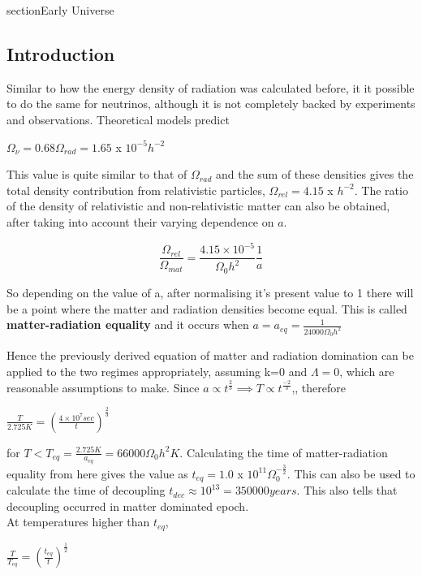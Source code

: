 section{Early Universe}
\subsection{Introduction}
Similar to how the energy density of radiation was calculated before, it it possible to do the same for neutrinos, although it is not completely backed by experiments and observations. Theoretical models predict

\begin{center}
    $\Omega_{\nu} = 0.68\Omega_{rad} = 1.65$ x $10^{-5}h^{-2}$
\end{center}

This value is quite similar to that of $\Omega_{rad}$ and the sum of these densities gives the total density contribution from relativistic particles, $\Omega_{rel} = 4.15$ x $h^{-2}$.
The ratio of the density of relativistic and non-relativistic matter can also be obtained, after taking into account their varying dependence on $a$.

\begin{equation}
    \frac{\Omega_{rel}}{\Omega_{mat}} = \frac{4.15 \times 10^{-5}}{\Omega_{0}h^2}\frac{1}{a}
\end{equation}

So depending on the value of a, after normalising it's present value to 1 there will be a point where the matter and radiation densities become equal. This is called \textbf{matter-radiation equality} and it occurs when $a = a_{eq} = \frac{1}{24000\Omega_{0}h^2}$

Hence the previously derived equation of matter and radiation domination can be applied to the two regimes appropriately, assuming k=0 and $\Lambda = 0$, which are reasonable assumptions to make.
Since $a \propto t^{\frac{2}{3}} \implies T \propto t^{\frac{-2}{3}}$,, therefore

\begin{center}
    $\frac{T}{2.725 K} = (\frac{4 \times 10^7 sec}{t})^{\frac{2}{3}}$
\end{center}
 for $T<T_{eq} = \frac{2.725 K}{a_{eq}} = 66000 \Omega_{0}h^2K$. Calculating the time of matter-radiation equality from here gives the value as $t_{eq} = 1.0$ x $10^11\Omega_{0}^{-\frac{3}{2}}$. This can also be used to calculate the time of decoupling $t_{dec} \approx 10^13 = 350000 years$. This also tells that decoupling occurred in matter dominated epoch.
\\
At temperatures higher than ${t_{eq}}$, 

\begin{center}
    $\frac{T}{T_{eq}} = (\frac{t_{eq}}{t})^{\frac{1}{2}}$
\end{center}

